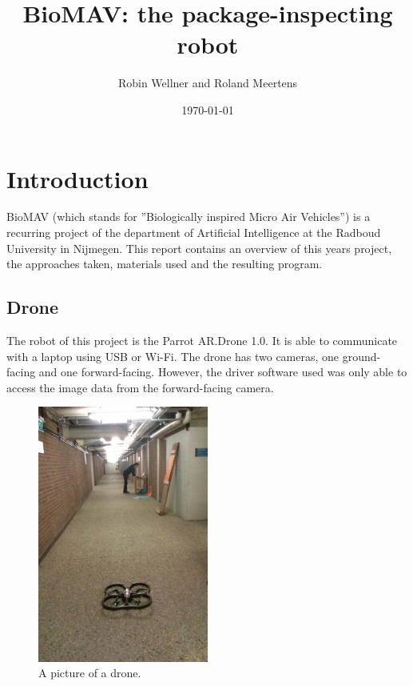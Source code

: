 \documentclass[a4paper,10pt]{article}
\begin{document}
\title{BioMAV: the package-inspecting robot}

\author{Robin Wellner and Roland Meertens}

\date{\today}

\maketitle

\section{Introduction}
BioMAV (which stands for ''Biologically inspired Micro Air Vehicles'') is a recurring project of the department of Artificial
Intelligence at the Radboud University in Nijmegen.
This report contains an overview of this years project, the approaches taken, materials used and the resulting program. 


\subsection{Drone}
The robot of this project is the Parrot AR.Drone 1.0. It is able to
communicate with a laptop using USB or Wi-Fi. The drone has two cameras, one
ground-facing and one forward-facing. However, the driver software used was only able to access the image data from the forward-facing camera.

\begin{figure}[h!]
	\caption{A picture of a drone.}
	\centering
	\includegraphics[width=0.5\textwidth]{images/boringHallway}
\end{figure}
\end{document}
